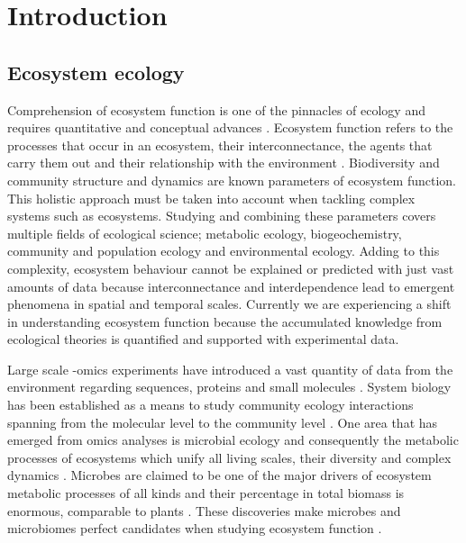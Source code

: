% 
% 


\chapter{Introduction}
\label{cha:intro}


\section{Ecosystem ecology}
\label{sec:intro-ecosystem}

Comprehension of ecosystem function is one of the pinnacles of ecology and
requires quantitative and conceptual advances \parencite{Chapin_Matson_Vitousek_2011}.
Ecosystem function refers to the processes that occur in an ecosystem, their
interconnectance, the agents that carry them out
and their relationship with the environment \parencite{Chapin_Matson_Vitousek_2011}. Biodiversity
\parencite{hooperEFFECTSBIODIVERSITYECOSYSTEM2005, loreau2001Biodiversity}
and community structure and dynamics \parencite{gonze2018Microbial,morris2020linking}
are known parameters of ecosystem function. This holistic approach must be taken
into account when tackling complex systems such as ecosystems. Studying and
combining these parameters covers multiple fields of ecological science;
metabolic ecology, biogeochemistry, community and population ecology and
environmental ecology. Adding to this complexity, ecosystem behaviour cannot be
explained or predicted with just vast amounts of data because interconnectance
and interdependence lead to emergent phenomena in spatial and temporal scales.
Currently we are experiencing a shift in understanding ecosystem function
because the accumulated knowledge from ecological theories is quantified and
supported with experimental data.

Large scale -omics experiments have introduced a vast quantity of data from the
environment regarding sequences, proteins and small molecules \parencite{shaffer2022Standardized}.
System biology has been established as a means to study community ecology interactions spanning
from the molecular level to the community level \parencite{raes2008Molecular}.
One area that has emerged from omics analyses is microbial ecology and
consequently the metabolic processes of ecosystems \parencite{perez_garcia2016Metabolic}
which unify all living scales, their diversity and complex dynamics \parencite{smith2016Origin}.
Microbes are claimed to be one of the major drivers of ecosystem metabolic
processes of all kinds \parencite{falkowski2008microbial,hall2018understanding} and
their percentage in total biomass is enormous, comparable to plants \parencite{bar2018biomass}.
These discoveries make microbes and microbiomes perfect candidates when
studying ecosystem function \parencite{klitgord2011Ecosystems,widder2016Challenges}.

